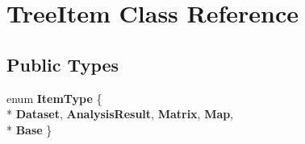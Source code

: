 \hypertarget{class_tree_item}{}\section{Tree\+Item Class Reference}
\label{class_tree_item}
\subsection*{Public Types}
\begin{DoxyCompactItemize}
\item 
enum {\bfseries Item\+Type} \{ \\*
{\bfseries Dataset}, 
{\bfseries Analysis\+Result}, 
{\bfseries Matrix}, 
{\bfseries Map}, 
\\*
{\bfseries Base}
 \}\hypertarget{class_tree_item_ae3c4cec229d671b60f704a3d8c445fca}{}\label{class_tree_item_ae3c4cec229d671b60f704a3d8c445fca}

\end{DoxyCompactItemize}
